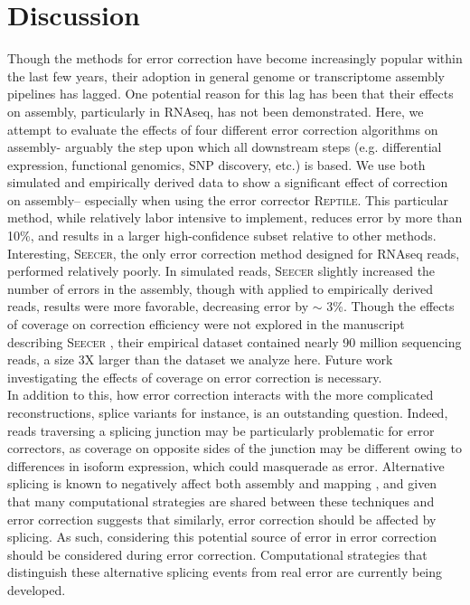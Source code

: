 \documentclass[11pt]{article}
\begin{document}
\section*{Discussion}

Though the methods for error correction have become increasingly popular within the last few years, their adoption in general genome or transcriptome assembly pipelines has lagged. One potential reason for this lag has been that their effects on assembly, particularly in RNAseq, has not been demonstrated. Here, we attempt to evaluate the effects of four different error correction algorithms on assembly- arguably the step upon which all downstream steps (e.g. differential expression, functional genomics, SNP discovery, etc.) is based. We use both simulated and empirically derived data to show a significant effect of correction on assembly-- especially when using the error corrector \textsc{Reptile}. This particular method, while relatively labor intensive to implement, reduces error by more than 10\%, and results in a larger high-confidence subset relative to other methods.  \\


\noindent
Interesting, \textsc{Seecer}, the only error correction method designed for RNAseq reads, performed relatively poorly. In simulated reads, \textsc{Seecer} slightly increased the number of errors in the assembly, though with applied to empirically derived reads, results were more favorable, decreasing error by $\sim$ 3\%.  Though the effects of coverage on correction efficiency were not explored in the manuscript describing \textsc{Seecer} \citep{Le:2013dy}, their empirical dataset contained nearly 90 million sequencing reads, a size 3X larger than the dataset we analyze here.  Future work investigating the effects of coverage on error correction is necessary.  \\

\noindent
In addition to this, how error correction interacts with the more complicated reconstructions, splice variants for instance, is an outstanding question. Indeed, reads traversing a splicing junction may be particularly problematic for error correctors, as coverage on opposite sides of the junction may be different owing to differences in isoform expression, which could masquerade as error.  Alternative splicing is known to negatively affect both assembly and mapping \citep{Vijay:2012gy,Sammeth:2009jx,Pyrkosz:2013tm}, and given that many computational strategies are shared between these techniques and error correction suggests that similarly, error correction should be affected by splicing.  As such, considering this potential source of error in error correction should be considered during error correction. Computational strategies that distinguish these alternative splicing events from real error are currently being developed.   \\
 
\end{document}
